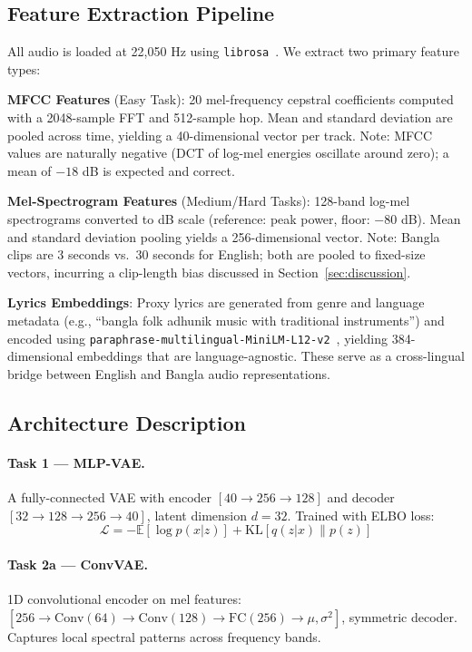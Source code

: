 \documentclass{article}
\begin{document}
\subsection{Feature Extraction Pipeline}

All audio is loaded at 22,050 Hz using \texttt{librosa}~\cite{mcfee2015librosa}. We extract two primary feature types:

\textbf{MFCC Features} (Easy Task): 20 mel-frequency cepstral coefficients computed with a 2048-sample FFT and 512-sample hop. Mean and standard deviation are pooled across time, yielding a 40-dimensional vector per track. Note: MFCC values are naturally negative (DCT of log-mel energies oscillate around zero); a mean of $-18$ dB is expected and correct.

\textbf{Mel-Spectrogram Features} (Medium/Hard Tasks): 128-band log-mel spectrograms converted to dB scale (reference: peak power, floor: $-80$ dB). Mean and standard deviation pooling yields a 256-dimensional vector. Note: Bangla clips are 3 seconds vs.\ 30 seconds for English; both are pooled to fixed-size vectors, incurring a clip-length bias discussed in Section~\ref{sec:discussion}.

\textbf{Lyrics Embeddings}: Proxy lyrics are generated from genre and language metadata (e.g., ``bangla folk adhunik music with traditional instruments'') and encoded using \texttt{paraphrase-multilingual-MiniLM-L12-v2}~\cite{reimers2019sentence}, yielding 384-dimensional embeddings that are language-agnostic. These serve as a cross-lingual bridge between English and Bangla audio representations.

\subsection{Architecture Description}

\paragraph{Task 1 --- MLP-VAE.} A fully-connected VAE with encoder $[40 \to 256 \to 128]$ and decoder $[32 \to 128 \to 256 \to 40]$, latent dimension $d\!=\!32$. Trained with ELBO loss:
\[
\mathcal{L} = -\mathbb{E}[\log p(x|z)] + \text{KL}[q(z|x) \| p(z)]
\]

\paragraph{Task 2a --- ConvVAE.} 1D convolutional encoder on mel features: $[256 \to \text{Conv}(64) \to \text{Conv}(128) \to \text{FC}(256) \to \mu, \sigma^2]$, symmetric decoder. Captures local spectral patterns across frequency bands.
\end{document}
